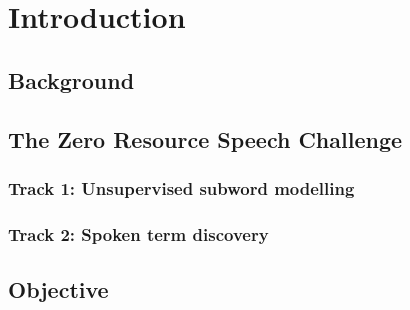 
\chapter{Introduction}

\section{Background}
\section{The Zero Resource Speech Challenge}
\subsection{Track 1: Unsupervised subword modelling}
\subsection{Track 2: Spoken term discovery}

\section{Objective}

